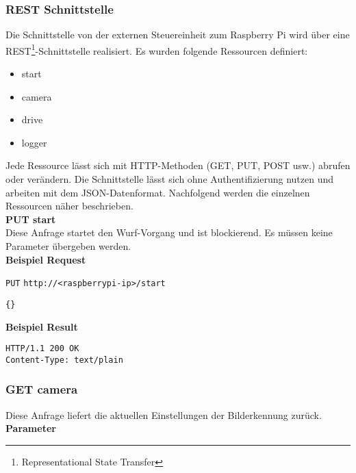 \subsubsection{REST Schnittstelle}
Die Schnittstelle von der externen Steuereinheit zum Raspberry Pi wird über eine REST\footnote{Representational State Transfer}-Schnittstelle realisiert. Es wurden folgende Ressourcen definiert:
\begin{itemize}
	\item start
	\item camera
	\item drive
	\item logger
\end{itemize}
Jede Ressource lässt sich mit HTTP-Methoden (GET, PUT, POST usw.) abrufen oder verändern. Die Schnittstelle lässt sich ohne Authentifizierung nutzen und arbeiten mit dem JSON-Datenformat. Nachfolgend werden die einzelnen Ressourcen näher beschrieben.\\

\noindent
\textbf{PUT start}\\
Diese Anfrage startet den Wurf-Vorgang und ist blockierend. Es müssen keine Parameter übergeben werden.\\
 
\textbf{Beispiel Request}

\texttt{PUT}
\texttt{http://<raspberrypi-ip>/start}

\begin{lstlisting}[caption=PUT start Request, tabsize=2]
{}
\end{lstlisting}

\textbf{Beispiel Result}

\begin{lstlisting}[caption=PUT start Response, tabsize=2]
HTTP/1.1 200 OK
Content-Type: text/plain
\end{lstlisting}





\subsubsection{GET camera}
Diese Anfrage liefert die aktuellen Einstellungen der Bilderkennung zurück.\\

\textbf{Parameter}

